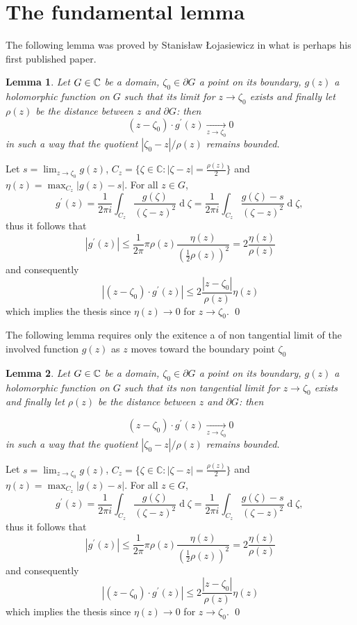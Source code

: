 \documentclass[a4paper,10pt]{article}
\newtheorem{lemma}{Lemma}
\begin{document}
\section{The fundamental lemma}
The following lemma was proved by Stanisław Łojasiewicz in what is perhaps his first published paper.

\begin{lemma}{\rm\cite[lemme II, p.~242]{Lojasiewicz1950}}\label{lemma:Loj} Let $G\in\Bbb C$ be a domain, $\zeta_0 \in\partial G$ a point on its boundary, $g(z)$ a holomorphic function on $G$ such that its limit for $z \to\zeta_0$ exists and finally let $\rho(z)$ be the distance between $z$ and $\partial G$: then
$$
\left(z-\zeta_0\right) \cdot g^{\prime}(z) \underset{z \to \zeta_0}{\longrightarrow} 0
$$
in such a way that the quotient $\left|\zeta_0-z\right| / \rho(z)$ remains bounded.
\end{lemma}
\proof Let  $s=\lim _{z \to\zeta_0} g(z)$, $C_z=\big\{\zeta \in \mathbb{C}: | \zeta-z \mid=\frac{\rho(z)}{2}\big\}$ and $\eta(z)=\max _{{C}_z}|g(z)-s|$. For all $z \in G$,
$$
g^{\prime}(z)=\frac{1}{2 \pi i} \int_{C_z} \frac{g(\zeta)}{(\zeta-z)^2} \operatorname{d}\!\zeta=\frac{1}{2 \pi i} \int_{C_z}\frac{g(\zeta)-s}{(\zeta-z)^2} \operatorname{d}\! \zeta \text {, }
$$
thus it follows that
$$
\left|g^{\prime}(z)\right| \leqslant \frac{1}{2 \pi} \pi \rho(z) \frac{\eta(z)}{\left(\frac{1}{2} \rho(z)\right)^2}=2 \frac{\eta(z)}{\rho(z)}
$$
and consequently
$$
\left|\left(z-\zeta_0\right) \cdot g^{\prime}(z)\right| \leqslant 2 \frac{\left|z-\zeta_0\right|}{\rho(z)} \eta(z)
$$
which implies the thesis since $\eta(z) \to 0$ for $z \to \zeta_0$. \qed

The following lemma requires only the exitence a of non tangential limit of the involved  function $g(z)$ as $z$ moves toward the boundary point $\zeta_0$

\begin{lemma}\label{lemma:main} Let $G\in\Bbb C$ be a domain, $\zeta_0 \in\partial G$ a point on its boundary, $g(z)$ a holomorphic function on $G$ such that its non tangential limit for $z \to\zeta_0$ exists and finally let $\rho(z)$ be the distance between $z$ and $\partial G$: then

$$
\left(z-\zeta_0\right) \cdot g^{\prime}(z) \underset{z \to \zeta_0}{\longrightarrow} 0
$$
in such a way that the quotient $\left|\zeta_0-z\right| / \rho(z)$ remains bounded.
\end{lemma}
\proof Let  $s=\lim _{z \to\zeta_0} g(z)$, $C_z=\big\{\zeta \in \mathbb{C} :| \zeta-z \mid=\frac{\rho(z)}{2}\big\}$ and $\eta(z)=\max _{{C}_z}|g(z)-s|$. For all $z \in G$,
$$
g^{\prime}(z)=\frac{1}{2 \pi i} \int_{C_z} \frac{g(\zeta)}{(\zeta-z)^2} \operatorname{d}\!\zeta=\frac{1}{2 \pi i} \int_{C_z}\frac{g(\zeta)-s}{(\zeta-z)^2} \operatorname{d}\! \zeta \text {, }
$$
thus it follows that
$$
\left|g^{\prime}(z)\right| \leqslant \frac{1}{2 \pi} \pi \rho(z) \frac{\eta(z)}{\left(\frac{1}{2} \rho(z)\right)^2}=2 \frac{\eta(z)}{\rho(z)}
$$
and consequently
$$
\left|\left(z-\zeta_0\right) \cdot g^{\prime}(z)\right| \leqslant 2 \frac{\left|z-\zeta_0\right|}{\rho(z)} \eta(z)
$$
which implies the thesis since $\eta(z) \to 0$ for $z \to \zeta_0$. \qed
\end{document}
